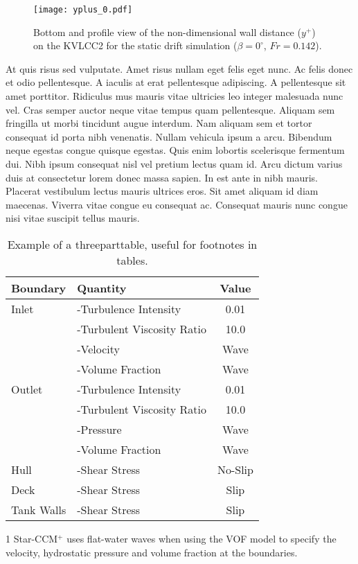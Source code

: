 \begin{figure}[]
	\centering
	\texttt{[image: yplus\_0.pdf]}  
	\caption{Bottom and profile view of the non-dimensional wall distance ($y^{+}$) on the KVLCC2 for the static drift simulation ($\beta=0^{\circ}$, $Fr=0.142$).}
	\label{fig:yplus}
\end{figure}
At quis risus sed vulputate. Amet risus nullam eget felis eget nunc. Ac felis donec et odio pellentesque. A iaculis at erat pellentesque adipiscing. A pellentesque sit amet porttitor. Ridiculus mus mauris vitae ultricies leo integer malesuada nunc vel. Cras semper auctor neque vitae tempus quam pellentesque. Aliquam sem fringilla ut morbi tincidunt augue interdum. Nam aliquam sem et tortor consequat id porta nibh venenatis. Nullam vehicula ipsum a arcu. Bibendum neque egestas congue quisque egestas. Quis enim lobortis scelerisque fermentum dui. Nibh ipsum consequat nisl vel pretium lectus quam id. Arcu dictum varius duis at consectetur lorem donec massa sapien. In est ante in nibh mauris. Placerat vestibulum lectus mauris ultrices eros. Sit amet aliquam id diam maecenas. Viverra vitae congue eu consequat ac. Consequat mauris nunc congue nisi vitae suscipit tellus mauris.


\begin{table}[h!]
\caption{Example of a threeparttable, useful for footnotes in tables.}
\label{tab:solver}
\centering
    \begin{threeparttable}
    	\begin{tabular}{llc}
			\toprule
			Boundary & Quantity & Value \\
			\midrule
			Inlet  & -Turbulence Intensity & 0.01 \\
				   & -Turbulent Viscosity Ratio & 10.0 \\
				   & -Velocity & Wave\tnote{1} \\
				   & -Volume Fraction & Wave\tnote{1}\\
			Outlet & -Turbulence Intensity & 0.01 \\
				   & -Turbulent Viscosity Ratio & 10.0 \\
				   & -Pressure & Wave\tnote{1} \\
				   & -Volume Fraction & Wave\tnote{1}\\
			Hull   & -Shear Stress & No-Slip\\
			Deck   & -Shear Stress & Slip\\
			Tank Walls  & -Shear Stress & Slip\\
			\bottomrule
		\end{tabular} 
    	\begin{tablenotes}
			\footnotesize
    		\item[1] Star-CCM$^{+}$ uses flat-water waves when using the VOF model to specify the velocity, hydrostatic pressure and volume fraction at the boundaries.
    	\end{tablenotes}
    \end{threeparttable}
\end{table}